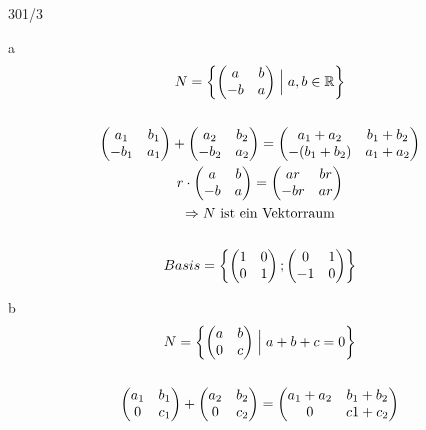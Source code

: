 \begin{exercise}{301/3}
  \item [a]
  \begin{gather*}
    N = \left\{\begin{pmatrix}a & b \\ -b & a\end{pmatrix} \Bigm| a, b \in \mathbb{R}\right\} \\\\
    \begin{pmatrix}a_1 & b_1 \\ -b_1 & a_1\end{pmatrix} + \begin{pmatrix}a_2 & b_2 \\ -b_2 & a_2\end{pmatrix} = \begin{pmatrix}a_1 + a_2 & b_1 + b_2 \\ -(b_1 + b_2) & a_1 + a_2\end{pmatrix} \\
    r \cdot \begin{pmatrix}a & b \\ -b & a\end{pmatrix} = \begin{pmatrix}ar & br \\ -br & ar\end{pmatrix} \\
    \Rightarrow \text{$N$ ist ein Vektorraum} \\\\
    Basis = \left\{\begin{pmatrix}1 & 0 \\ 0 & 1\end{pmatrix}; \begin{pmatrix}0 & 1 \\ -1 & 0\end{pmatrix}\right\}
  \end{gather*}
  \item [b]
  \begin{gather*}
    N = \left\{\begin{pmatrix}a & b \\ 0 & c\end{pmatrix} \Bigm| a + b + c = 0\right\} \\\\
    \begin{pmatrix}a_1 & b_1 \\ 0 & c_1\end{pmatrix} + \begin{pmatrix}a_2 & b_2 \\ 0 & c_2\end{pmatrix} = \begin{pmatrix}a_1 + a_2 & b_1 + b_2 \\ 0 & c1 + c_2\end{pmatrix} \\

\end{gather*}
\end{exercise}
